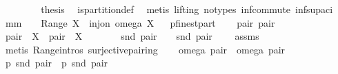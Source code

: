 \begin{isabellebody}
\ \ \ \ \isacommand{{\isacharbraceright}}\isamarkupfalse%
\isanewline
\ \ \isamarkupfalse%
\ {\isacharquery}thesis\ \isamarkupfalse%
\ is{\isacharunderscore}partition{\isacharunderscore}def\ \isamarkupfalse%
\ {\isacharparenleft}metis\ {\isacharparenleft}lifting{\isacharcomma}\ no{\isacharunderscore}types{\isacharparenright}\ inf{\isacharunderscore}commute\ inf{\isacharunderscore}sup{\isacharunderscore}aci{\isacharparenleft}{}{\isacharparenright}{\isacharparenright}\isanewline
{}\isamarkupfalse%
%
\endisatagproof
{\isafoldproof}%
%
\isadelimproof
\isanewline
%
\endisadelimproof
\isanewline
{}\isamarkupfalse%
\ mm{}{}{\isacharcolon}\ \ {\isachardoublequoteopen}{\isacharbraceleft}{\isacharbraceright}\ {\isasymnotin}\ Range\ X{\isachardoublequoteclose}\ \ {\isachardoublequoteopen}inj{\isacharunderscore}on\ omega\ X{\isachardoublequoteclose}\isanewline
%
\isadelimproof
%
\endisadelimproof
%
\isatagproof
{}\isamarkupfalse%
\ {\isacharminus}\isanewline
{}\isamarkupfalse%
\ {\isacharquery}p{\isacharequal}finestpart\isanewline
\isacommand{{\isacharbraceleft}}\isamarkupfalse%
\isanewline
\ \ \isamarkupfalse%
\ pair{}\ pair{}\ \isamarkupfalse%
\ {\isachardoublequoteopen}pair{}\ {\isasymin}\ X\ {\isacharampersand}\ pair{}\ {\isasymin}\ X{\isachardoublequoteclose}\ \isamarkupfalse%
\ \isamarkupfalse%
\ \isanewline
\ \ {}{\isacharcolon}\ {\isachardoublequoteopen}snd\ pair{}\ {\isasymnoteq}\ {\isacharbraceleft}{\isacharbraceright}\ {\isacharampersand}\ snd\ pair{}\ {\isasymnoteq}\ {\isacharbraceleft}{\isacharbraceright}{\isachardoublequoteclose}\ \isamarkupfalse%
\ assms\ \isamarkupfalse%
\ {\isacharparenleft}metis\ Range{\isachardot}intros\ surjective{\isacharunderscore}pairing{\isacharparenright}\isanewline
\ \ \isamarkupfalse%
\ {\isachardoublequoteopen}omega\ pair{}\ {\isacharequal}\ omega\ pair{}{\isachardoublequoteclose}\ \isamarkupfalse%
\ \isamarkupfalse%
\ \isamarkupfalse%
\ {\isachardoublequoteopen}{\isacharquery}p\ {\isacharparenleft}snd\ pair{}{\isacharparenright}\ {\isacharequal}\ {\isacharquery}p\ {\isacharparenleft}snd\ pair{}{\isacharparenright}{\isachardoublequoteclose}\ \isamarkupfalse%

\end{isabellebody}
